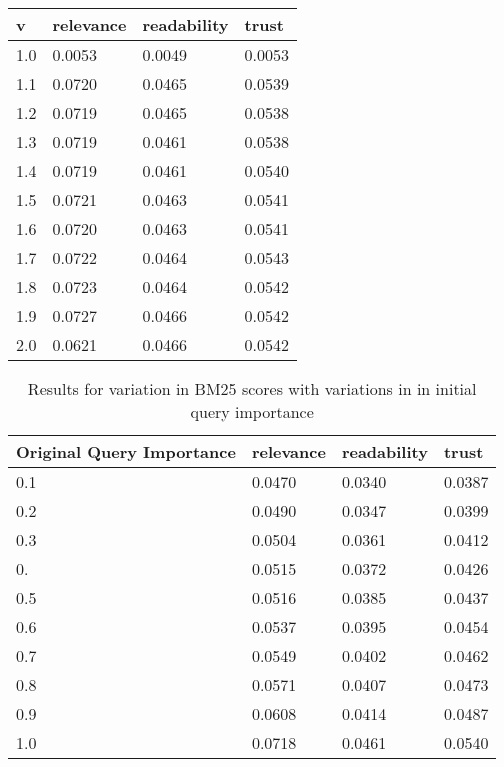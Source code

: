 \documentclass[11pt]{article}
\begin{document}
\begin{table}[]
\begin{tabular}{|l|l|l|l|} \hline
v   & relevance & readability & trust  \\ \hline
1.0 & 0.0053    & 0.0049     & 0.0053 \\ \hline
1.1 & 0.0720    & 0.0465     & 0.0539 \\\hline
1.2 & 0.0719    & 0.0465     & 0.0538 \\\hline
1.3 & 0.0719    & 0.0461     & 0.0538 \\\hline
1.4  & 0.0719    & 0.0461     & 0.0540 \\\hline
1.5 & 0.0721    & 0.0463     & 0.0541 \\\hline
1.6 & 0.0720    & 0.0463     & 0.0541 \\\hline
1.7 & 0.0722    & 0.0464     & 0.0543 \\\hline
1.8 & 0.0723    & 0.0464     & 0.0542 \\\hline
1.9 & 0.0727    & 0.0466     & 0.0542 \\\hline
2.0 & 0.0621    & 0.0466     & 0.0542 \\ \hline
\end{tabular}
\caption{}
\label{tab:vary-k}
\end{table}
\begin{table}[]
\begin{tabular}{|l|l|l|l|} \hline
Original Query Importance   & relevance & readability & trust  \\\hline
0.1 & 0.0470    & 0.0340     & 0.0387 \\\hline
0.2 & 0.0490    & 0.0347     & 0.0399 \\\hline
0.3 & 0.0504    & 0.0361     & 0.0412 \\\hline
0.  & 0.0515    & 0.0372     & 0.0426 \\\hline
0.5 & 0.0516    & 0.0385     & 0.0437 \\\hline
0.6 & 0.0537    & 0.0395     & 0.0454 \\\hline
0.7 & 0.0549    & 0.0402     & 0.0462 \\\hline
0.8 & 0.0571    & 0.0407     & 0.0473 \\\hline
0.9 & 0.0608    & 0.0414     & 0.0487 \\\hline
1.0 & 0.0718    & 0.0461     & 0.0540 \\\hline
\end{tabular}
\caption{Results for variation in BM25 scores with variations in in initial query importance}
\label{tab:vary-rm3}
\end{table}
\end{document}
